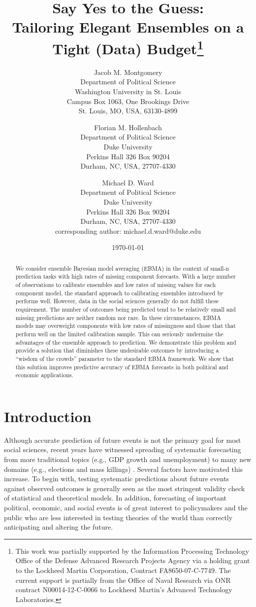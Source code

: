 \documentclass[12pt,fullpage,endnotes]{article}
\title{Say Yes to the Guess: \\ Tailoring Elegant Ensembles on a Tight
  (Data) Budget\thanks{This work was partially supported by the Information Processing Technology Office of the Defense Advanced Research Projects Agency via a holding grant to the Lockheed Martin Corporation, Contract FA8650-07-C-7749. The current support is partially from the Office of Naval Research via ONR contract N00014-12-C-0066 to Lockheed Martin's Advanced Technology Laboratories.
    }}
\author{
Jacob M. Montgomery\\
	Department of Political Science\\
	Washington University in St. Louis\\
	Campus Box 1063, One Brookings Drive\\
	St. Louis, MO, USA, 63130-4899 
	\and
Florian M. Hollenbach  \\
	Department of Political Science\\
	Duke University\\
	Perkins Hall 326 Box 90204\\
	Durham, NC, USA, 27707-4330
	\and
Michael D. Ward\\
	Department of Political Science\\
	Duke University\\
	Perkins Hall 326 Box 90204\\
	Durham, NC, USA, 27707-4330\\
	corresponding author: michael.d.ward@duke.edu
}
\date{\today}
\begin{document}
\maketitle
\thispagestyle{empty}
\clearpage
\pagestyle{myheadings}
\newpage

\thispagestyle{empty}


\begin{abstract}
  \noindent We consider ensemble Bayesian model averaging (EBMA) in
  the context of small-n prediction tasks with high rates of missing
  component forecasts.  With a large number of observations to
  calibrate ensembles and low rates of missing values for each
  component model, the standard approach to calibrating ensembles
  introduced by \cite{Raftery:2005} performs well. However, data in
  the social sciences generally do not fulfill these requirement. The
  number of outcomes being predicted tend to be relatively small and
  missing predictions are neither random nor rare. In these
  circumstances, EBMA models may overweight components with low rates
  of missingness and those that that perform well on the limited
  calibration sample.  This can seriously undermine the advantages of
  the ensemble approach to prediction.  We demonstrate this problem
  and provide a solution that diminishes these undesirable outcomes by
  introducing a ``wisdom of the crowds'' parameter to the standard
  EBMA framework. We show that this solution improves predictive
  accuracy of EBMA forecasts in both political and economic
  applications.
\end{abstract}

\doublespacing


\setcounter{page}{1}

\section{Introduction}

Although accurate prediction of future events is not the primary goal
for most social sciences, recent years have witnessed spreading of
systematic forecasting from more traditional topics (e.g., GDP growth
and unemployment) to many new domains (e.g., elections and mass
killings) .  Several factors have motivated this increase.  To begin
with, testing systematic predictions about future events against
observed outcomes is generally seen as the most stringent validity
check of statistical and theoretical models.  In addition, forecasting
of important political, economic, and social events is of great
interest to policymakers and the public who are less interested in
testing theories of the world than correctly anticipating and altering
the future.
\end{document}
